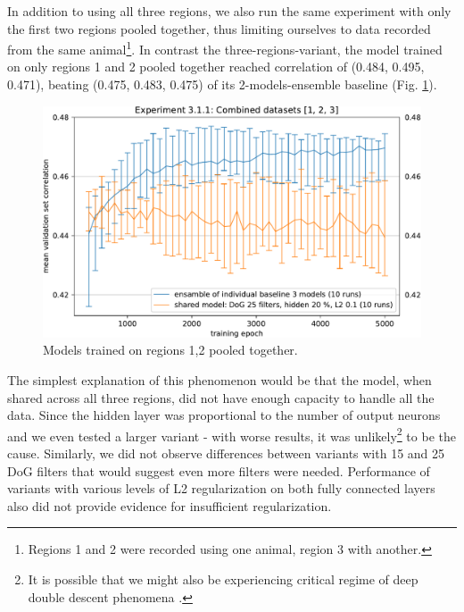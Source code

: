 In addition to using all three regions, we also run the same experiment with only the first two regions pooled together, thus limiting ourselves to data recorded from the same animal\footnote{Regions 1 and 2 were recorded using one animal, region 3 with another.}. In contrast the three-regions-variant, the model trained on only regions 1 and 2 pooled together reached correlation of (0.484, 0.495, 0.471), beating (0.475, 0.483, 0.475) of its 2-models-ensemble baseline (Fig. \ref{fig:5.3.1.1_2}).

\begin{figure}[H]
    \centering
    \includegraphics[width=1\textwidth]{../figures/05_3_1_1_2}
    \caption[Experiment 3.1.1 2]{Models trained on regions 1,2 pooled together\protect\footnotemark.}
    \label{fig:5.3.1.1_2}
\end{figure}

The simplest explanation of this phenomenon would be that the model, when shared across all three regions, did not have enough capacity to handle all the data. Since the hidden layer was proportional to the number of output neurons and we even tested a larger variant - with worse results, it was unlikely\footnote{It is possible that we might also be experiencing critical regime of deep double descent phenomena \citep{2019arXiv191202292N}.} to be the cause. Similarly, we did not observe differences between variants with 15 and 25 DoG filters that would suggest even more filters were needed. Performance of variants with various levels of L2 regularization on both fully connected layers also did not provide evidence for insufficient regularization. 

